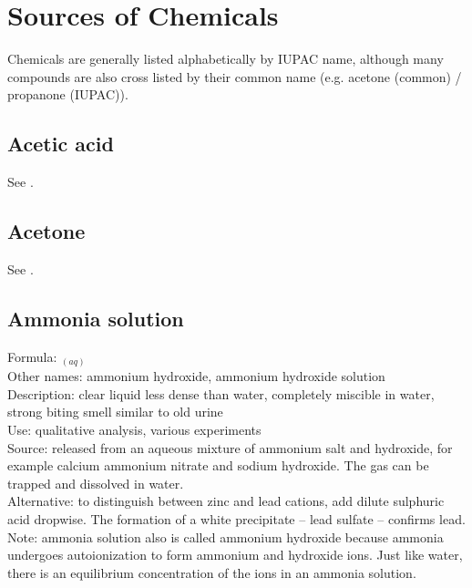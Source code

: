 \section{Sources of Chemicals}
\label{cha:sourcesofchemicals}

Chemicals are generally listed alphabetically by IUPAC name, 
although many compounds are also cross listed by their common name (e.g. 
acetone (common) / propanone (IUPAC)).

\subsection{Acetic acid}
See .
\subsection{Acetone}
See .
\subsection{Ammonia solution}
\label{sec:ammoniasol}
Formula: $_{(aq)}$\\
Other names: ammonium hydroxide, 
ammonium hydroxide solution\\
Description: clear liquid less dense than water, 
completely miscible in water, 
strong biting smell similar to old urine\\
Use: qualitative analysis, various experiments\\
Source: released from an aqueous mixture of ammonium salt and hydroxide, 
for example calcium ammonium nitrate and sodium hydroxide. 
The gas can be trapped and dissolved in water.\\
Alternative: to distinguish between zinc and lead cations, 
add dilute sulphuric acid dropwise. 
The formation of a white precipitate -- lead sulfate -- confirms lead.
Note: ammonia solution also is called ammonium hydroxide 
because ammonia undergoes autoionization to form ammonium and hydroxide ions. 
Just like water, 
there is an equilibrium concentration of the ions in an ammonia solution.
